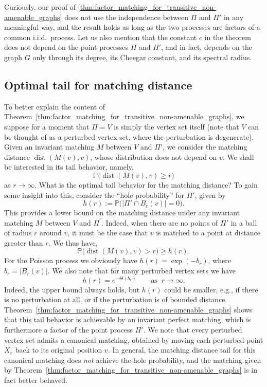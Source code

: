 \documentclass[11pt, reqno]{article}
\numberwithin{equation}{section}
\theoremstyle{definition}
\def\P{\mathbb{P}}
\newcommand{\1}{\mathds{1}}
\DeclareMathOperator{\dist}{dist}
\begin{document}
\noindent
Curiously, our proof of \cref{thm:factor_matching_for_transitive_non-amenable_graphs} does not use the independence between $\Pi$ and $\Pi'$ in any meaningful way, and the result holds as long as the two processes are factors of a common i.i.d.\ process.
Let us also mention that the constant $c$ in the theorem does not depend on the point processes $\Pi$ and $\Pi'$, and in fact, depends on the graph $G$ only through its degree, its Cheegar constant, and its spectral radius.

\subsection{Optimal tail for matching distance}
To better explain the content of Theorem~\ref{thm:factor_matching_for_transitive_non-amenable_graphs}, we suppose for a moment that $\Pi = V$ is simply the vertex set itself (note that $V$ can be thought of as a perturbed vertex set, where the perturbation is degenerate). 
Given an invariant matching $M$ between $V$ and $\Pi'$, we consider the matching distance $\dist(M(v),v)$, whose distribution does not depend on $v$. 
We shall be interested in its tail behavior, namely, 
\begin{equation} \label{eq:intro_tail_for_M_v}
    \P \big(\dist(M(v),v) \ge r\big) 
\end{equation}
as $r\to \infty$. 
What is the optimal tail behavior for the matching distance?
To gain some insight into this, consider the ``hole probability'' for $\Pi'$, given by
\[ h(r) := \P\big(|\Pi'\cap B_r(v)| = 0\big) .\]
This provides a lower bound on the matching distance under any invariant matching $M$ between $V$ and $\Pi^\prime$. Indeed, when there are no points of $\Pi'$ in a ball of radius $r$ around $v$, it must be the case that $v$ is matched to a point at distance greater than $r$. We thus have, 
$$\P\big(\dist(M(v),v)>r\big) \ge h(r).$$
For the Poisson process we obviously have $h(r) = \exp(-b_r)$, where $b_r=|B_r(v)|$. We also note that for many perturbed vertex sets we have 
\[ h(r) = e^{-\Theta(b_r)} \qquad\text{as } \ r \to \infty .\]
Indeed, the upper bound always holds, but $h(r)$ could be smaller, e.g., if there is no perturbation at all, or if the perturbation is of bounded distance.
Theorem~\ref{thm:factor_matching_for_transitive_non-amenable_graphs} shows that this tail behavior is achievable by an invariant perfect matching, which is furthermore a factor of the point process $\Pi'$. We note that every perturbed vertex set admits a canonical matching, obtained by moving each perturbed point $X_v$ back to its original position $v$. In general, the matching distance tail for this canonical matching does \emph{not} achieve the hole probability, and the matching given by Theorem~\ref{thm:factor_matching_for_transitive_non-amenable_graphs} is in fact better behaved. 
\end{document}
